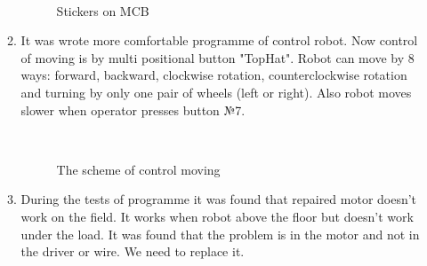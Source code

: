 \begin{enumerate}
\begin{enumerate}
\begin{figure}[H]
\begin{minipage}[h]{0.29\linewidth}
			\end{minipage}
			\hfill
			\begin{minipage}[h]{0.1\linewidth}
				\center  
			\end{minipage}
			\caption{Stickers on MCB}
		\end{figure}
		
        \item It was wrote more comfortable programme of control robot. Now control of moving is by multi positional button "TopHat". Robot can move by 8 ways: forward, backward, clockwise rotation, counterclockwise rotation and turning by only one pair of wheels (left or right). Also robot moves slower when operator presses button №7.
        \begin{figure}[H]
	  	  \begin{minipage}[h]{0.2\linewidth}
	  		\center  
	  	  \end{minipage}
	  	  \begin{minipage}[h]{0.6\linewidth}
	  		\caption{The scheme of control moving}
	  	  \end{minipage}
	   \end{figure}
	   
	   \item During the tests of programme it was found that repaired motor doesn't work on the field. It works when robot above the floor but doesn't work under the load. It was found that the problem is in the motor and not in the driver or wire. We need to replace it.
	   

\end{enumerate}
\end{enumerate}
